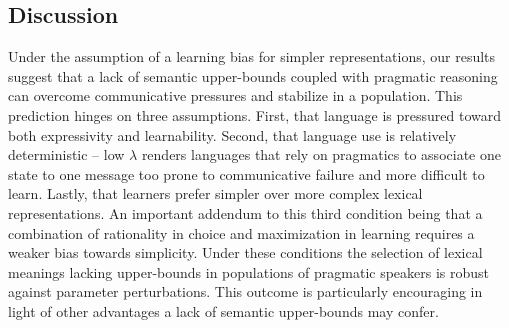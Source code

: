 \documentclass[a4paper]{article}
\begin{document}
\subsection{Discussion}
Under the assumption of a learning bias for simpler representations, our results suggest that a lack of semantic upper-bounds coupled with pragmatic reasoning can overcome communicative pressures and stabilize in a population. This prediction hinges on three assumptions. First, that language is pressured toward both expressivity and learnability. Second, that language use is relatively deterministic -- low $\lambda$ renders languages that rely on pragmatics to associate one state to one message too prone to communicative failure and more difficult to learn. Lastly, that learners prefer simpler over more complex lexical representations. An important addendum to this third condition being that a combination of rationality in choice and maximization in learning requires a weaker bias towards simplicity. Under these conditions the selection of lexical meanings lacking upper-bounds in populations of pragmatic speakers is robust against parameter perturbations.  This outcome is particularly encouraging in light of other advantages a lack of semantic upper-bounds may confer. 
\end{document}
